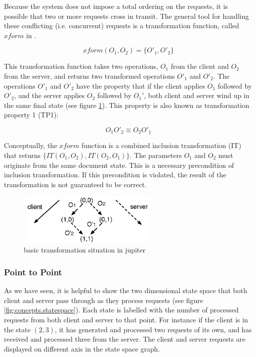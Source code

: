 Because the system does not impose a total ordering on the requests, it is
possible that two or more requests cross in transit. The general tool for 
handling these conflicting (i.e. concurrent) requests is a transformation function, called $xform$ in \cite{jupiter95}.

$$ xform(O_1,O_2)=\{O'_1,O'_2\} $$

This transformation function takes two operations, $O_1$ from the client and 
$O_2$ from the server, and returns two transformed operations $O'_1$ and $O'_2$.
The operations $O'_1$ and $O'_2$ have the property that if the client applies 
$O_1$ followed by $O'_2$, and the server applies $O_2$ followed by $O_1'$, both 
client and server wind up in the same final state (see figure 
\ref{fig:concepts.basic}). This property is also known as transformation property 1 (TP1):

$$ O_1 O'_2 \equiv O_2 O'_1 $$

Conceptually, the $xform$ function is a combined inclusion transformation (IT) 
that returns $\{IT(O_1,O_2),IT(O_2,O_1)\}$. The parameters $O_1$ and $O_2$ must 
originate from the same document state. This is a necessary precondition of 
inclusion transformation. If this precondition is violated, the result of the 
transformation is not guaranteed to be correct.

\begin{figure}[htb]
 \centering
 \includegraphics[width=6.85cm,height=2.5cm]{../images/finalreport/concepts_jupiter1.eps}
 \caption{basic transformation situation in jupiter}
 \label{fig:concepts.basic}
\end{figure}

\subsubsection{Point to Point}
As we have seen, it is helpful to show the two dimensional state space that both client and server pass through as they process requests (see figure \ref{fig:concepts.statespace}). Each state is labelled with the number of processed requests from both client and server to that point. For instance if the client is in the state $(2,3)$, it has generated and processed two requests of its own, and has received and processed three from the server. The client and server requests are displayed on different axis in the state space graph.

